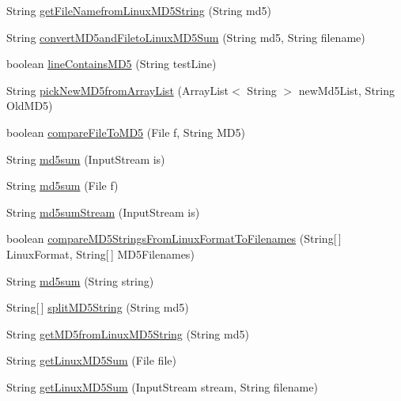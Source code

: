 \begin{DoxyCompactItemize}
String \hyperlink{class_c_a_s_u_a_l_1_1crypto_1_1_m_d5sum_a439b3e62c238ee0b72f4f13b552bf7a3}{get\-File\-Namefrom\-Linux\-M\-D5\-String} (String md5)
\item 
String \hyperlink{class_c_a_s_u_a_l_1_1crypto_1_1_m_d5sum_a193a8d10d29e316913e9aa5a78707657}{convert\-M\-D5and\-Fileto\-Linux\-M\-D5\-Sum} (String md5, String filename)
\item 
boolean \hyperlink{class_c_a_s_u_a_l_1_1crypto_1_1_m_d5sum_a95ab6e6c8e59044b302a7b5bf505211a}{line\-Contains\-M\-D5} (String test\-Line)
\item 
String \hyperlink{class_c_a_s_u_a_l_1_1crypto_1_1_m_d5sum_a442e88f7440e8c11312bbb83318f6710}{pick\-New\-M\-D5from\-Array\-List} (Array\-List$<$ String $>$ new\-Md5\-List, String Old\-M\-D5)
\item 
boolean \hyperlink{class_c_a_s_u_a_l_1_1crypto_1_1_m_d5sum_a0179d638f6ae800b156ca5919e07abd9}{compare\-File\-To\-M\-D5} (File f, String M\-D5)
\item 
String \hyperlink{class_c_a_s_u_a_l_1_1crypto_1_1_m_d5sum_ab4d622e3672fd560e125788e8c11da65}{md5sum} (Input\-Stream is)
\item 
String \hyperlink{class_c_a_s_u_a_l_1_1crypto_1_1_m_d5sum_aba2245d66d6ca47b7bce88b31fec319d}{md5sum} (File f)
\item 
String \hyperlink{class_c_a_s_u_a_l_1_1crypto_1_1_m_d5sum_ab3881ae275c9c2e89d3bbe0c20267f90}{md5sum\-Stream} (Input\-Stream is)
\item 
boolean \hyperlink{class_c_a_s_u_a_l_1_1crypto_1_1_m_d5sum_a891774e4ad9bd42758f268cff8b99c1a}{compare\-M\-D5\-Strings\-From\-Linux\-Format\-To\-Filenames} (String\mbox{[}$\,$\mbox{]} Linux\-Format, String\mbox{[}$\,$\mbox{]} M\-D5\-Filenames)
\item 
String \hyperlink{class_c_a_s_u_a_l_1_1crypto_1_1_m_d5sum_a03e30cfb69b9e4edce983b18db357103}{md5sum} (String string)
\item 
String\mbox{[}$\,$\mbox{]} \hyperlink{class_c_a_s_u_a_l_1_1crypto_1_1_m_d5sum_a3ade14378f1ab5473e8cc4f9586a5b20}{split\-M\-D5\-String} (String md5)
\item 
String \hyperlink{class_c_a_s_u_a_l_1_1crypto_1_1_m_d5sum_a6c175a3bfcc8ff9d9ccfdfe5570c6748}{get\-M\-D5from\-Linux\-M\-D5\-String} (String md5)
\item 
String \hyperlink{class_c_a_s_u_a_l_1_1crypto_1_1_m_d5sum_ab47b5cec8ec08d6aef4fc80305644ea3}{get\-Linux\-M\-D5\-Sum} (File file)
\item 
String \hyperlink{class_c_a_s_u_a_l_1_1crypto_1_1_m_d5sum_a99840f961574366d47cad9e5415cba0a}{get\-Linux\-M\-D5\-Sum} (Input\-Stream stream, String filename)

\end{DoxyCompactItemize}
